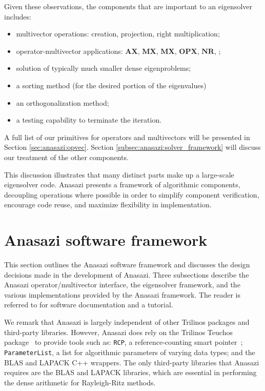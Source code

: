 \documentclass[acmtoms,acmnow]{acmtrans2m}
\begin{document}
Given these observations, the components that are important
to an eigensolver includes:
\begin{itemize}
  \item multivector operations: creation,
        projection, right multiplication;
  \item operator-multivector applications:
        $\mathbf{A} \mathbf{X}$, $\mathbf{M} \mathbf{X}$, $\mathbf{M}
        \mathbf{X}$, $\mathbf{OP}\mathbf{X}$,
        $\mathbf{N R}$, ;
  \item solution of typically much smaller dense eigenproblems;
  \item a sorting method (for the desired portion of the
  eigenvalues)
  \item an orthogonalization method;
  \item a testing capability to terminate the iteration.
\end{itemize}
A full list of our primitives for operators and multivectors
will be presented in Section \ref{sec:anasazi:opvec}.
Section \ref{subsec:anasazi:solver_framework} will discuss
our treatment of the other components.

This discussion illustrates that many distinct parts make up
a large-scale eigensolver code.
Anasazi presents a framework of algorithmic components,
decoupling operations where possible in order to simplify
component verification, encourage code reuse, and maximize
flexibility in implementation.


\section{Anasazi software framework}
\label{sec:framework}

This section outlines the Anasazi software framework and discusses 
the design decisions made in the development of Anasazi. Three
subsections describe the Anasazi operator/multivector interface, the
eigensolver framework, and the various implementations provided by the
Anasazi framework. The reader is referred to
\cite{Trilinos:Anasazi,Trilinos-Tutorial} for software documentation
and a tutorial.

We remark that Anasazi is largely independent of other Trilinos packages and
third-party libraries. However, Anasazi does rely on the Trilinos Teuchos 
package~\cite{Trilinos:Teuchos} to provide tools such as: \texttt{RCP},
a reference-counting smart pointer~\cite{Detlefs:1992:GCR,Teuchos-RCP};
\texttt{ParameterList}, a list for algorithmic parameters of
varying data types; and the BLAS \cite{Lawson:1979:BLA,Blackford:2002:USB} 
and LAPACK \cite{abbd:95} C++ wrappers.
The only third-party libraries that Anasazi requires are the BLAS and
LAPACK libraries, which are essential in performing the dense arithmetic
for Rayleigh-Ritz methods.
\end{document}
